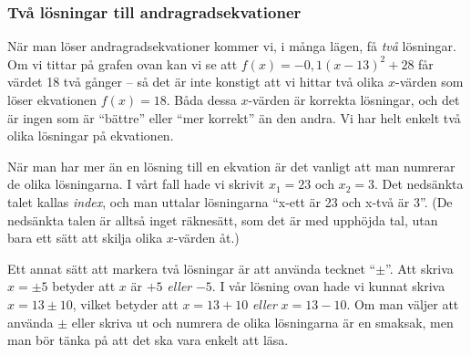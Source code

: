 \subsubsection{Två lösningar till andragradsekvationer}

När man löser andragradsekvationer kommer vi, i många lägen, få \emph{två} lösningar.
Om vi tittar på grafen ovan kan vi se att $f(x) = -0,1(x-13)^2+28$ får värdet 18 två gånger -- så det är inte konstigt att vi hittar två olika $x$-värden som löser ekvationen $f(x)=18$.
Båda dessa $x$-värden är korrekta lösningar, och det är ingen som är ``bättre'' eller ``mer korrekt'' än den andra.
Vi har helt enkelt två olika lösningar på ekvationen.

När man har mer än en lösning till en ekvation är det vanligt att man numrerar de olika lösningarna.
I vårt fall hade vi skrivit $x_1=23$ och $x_2=3$.
Det nedsänkta talet kallas \emph{index}, och man uttalar lösningarna ``x-ett är 23 och x-två är 3''.
(De nedsänkta talen är alltså inget räknesätt, som det är med upphöjda tal, utan bara ett sätt att skilja olika $x$-värden åt.)

Ett annat sätt att markera två lösningar är att använda tecknet ``$\pm$''.
Att skriva $x=\pm 5$ betyder att $x$ är $+5$ \emph{eller} $-5$.
I vår lösning ovan hade vi kunnat skriva $x=13 \pm 10$, vilket betyder att $x=13+10$ \emph{eller} $x=13-10$.
Om man väljer att använda $\pm$ eller skriva ut och numrera de olika lösningarna är en smaksak, men man bör tänka på att det ska vara enkelt att läsa.
